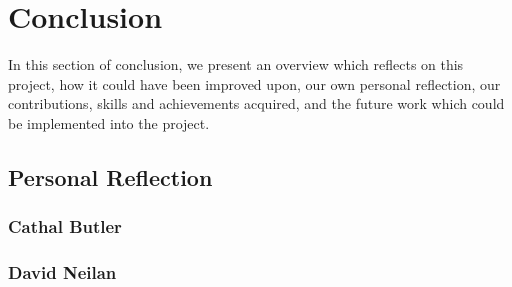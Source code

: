 \chapter{Conclusion}
In this section of conclusion, we present an overview which reflects on this project, how it could have been improved upon, our own personal reflection, our contributions, skills and achievements acquired, and the future work which could be implemented into the project.

\section{Personal Reflection}
\subsection{Cathal Butler}
\subsection{David Neilan}
